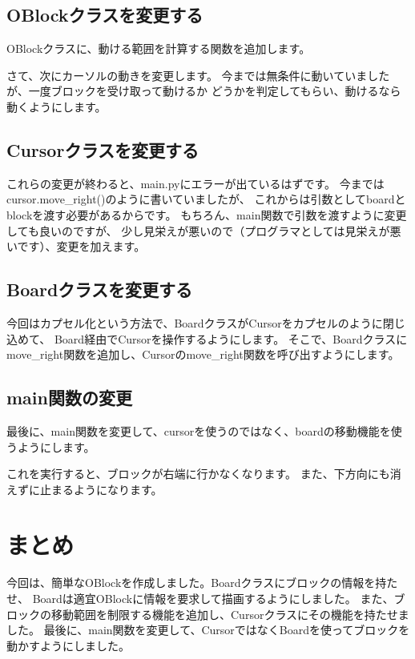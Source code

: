 \documentclass[12pt, a4paper, dvipdfmx]{book}
\begin{document}
\subsection{OBlockクラスを変更する}
OBlockクラスに、動ける範囲を計算する関数を追加します。

さて、次にカーソルの動きを変更します。
今までは無条件に動いていましたが、一度ブロックを受け取って動けるか
どうかを判定してもらい、動けるなら動くようにします。

\subsection{Cursorクラスを変更する}

これらの変更が終わると、main.pyにエラーが出ているはずです。
今まではcursor.move\_right()のように書いていましたが、
これからは引数としてboardとblockを渡す必要があるからです。
もちろん、main関数で引数を渡すように変更しても良いのですが、
少し見栄えが悪いので（プログラマとしては見栄えが悪いです）、変更を加えます。
\subsection{Boardクラスを変更する}
今回はカプセル化という方法で、BoardクラスがCursorをカプセルのように閉じ込めて、
Board経由でCursorを操作するようにします。
そこで、Boardクラスにmove\_right関数を追加し、Cursorのmove\_right関数を呼び出すようにします。

\subsection{main関数の変更}
最後に、main関数を変更して、cursorを使うのではなく、boardの移動機能を使うようにします。

これを実行すると、ブロックが右端に行かなくなります。
また、下方向にも消えずに止まるようになります。

\section{まとめ}
今回は、簡単なOBlockを作成しました。Boardクラスにブロックの情報を持たせ、
Boardは適宜OBlockに情報を要求して描画するようにしました。
また、ブロックの移動範囲を制限する機能を追加し、Cursorクラスにその機能を持たせました。
最後に、main関数を変更して、CursorではなくBoardを使ってブロックを動かすようにしました。
\end{document}
